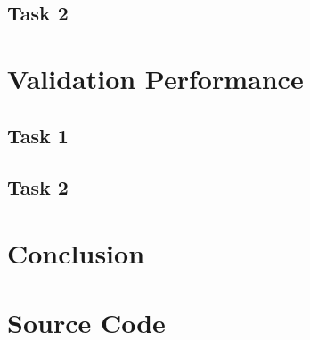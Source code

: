 \documentclass{article}
\begin{document}
\subsection{Task 2}
\label{sec:imp-2}

\section{Validation Performance}
\label{sec:val}

\subsection{Task 1}
\label{sec:val-1}

\subsection{Task 2}
\label{sec:val-2}

\section{Conclusion}
\label{sec:conclusion}

\clearpage



\appendix

\section{Source Code}
\label{sec:source-code}
\end{document}
